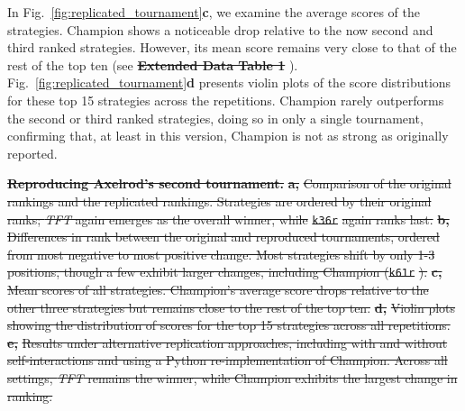 \documentclass{article}
\newcommand{\TFT}{\emph{TFT}}
\providecommand{\DIFaddtex}[1]{{\protect\color{blue}\uwave{#1}}} %
\providecommand{\DIFdeltex}[1]{{\protect\color{red}\sout{#1}}}                      %
\providecommand{\DIFaddbegin}{} %
\providecommand{\DIFaddend}{} %
\providecommand{\DIFdelbegin}{} %
\providecommand{\DIFdelend}{} %
\providecommand{\DIFdelFL}[1]{\DIFdel{#1}} %
\providecommand{\DIFadd}[1]{\texorpdfstring{\DIFaddtex{#1}}{#1}} %
\providecommand{\DIFdel}[1]{\texorpdfstring{\DIFdeltex{#1}}{}} %
\newcommand{\DIFscaledelfig}{0.5}
\newlength{\DIFdelgraphicswidth} %
\newlength{\DIFdelgraphicsheight} %
\newcommand{\DIFaddincludegraphics}[2][]{{\color{blue}\fbox{\DIFOincludegraphics[#1]{#2}}}} %
\newcommand{\DIFdelincludegraphics}[2][]{%
\sbox{\DIFdelgraphicsbox}{\DIFOincludegraphics[#1]{#2}}%
\settoboxwidth{\DIFdelgraphicswidth}{\DIFdelgraphicsbox} %
\settoboxtotalheight{\DIFdelgraphicsheight}{\DIFdelgraphicsbox} %
\scalebox{\DIFscaledelfig}{%
\parbox[b]{\DIFdelgraphicswidth}{\usebox{\DIFdelgraphicsbox}\\[-\baselineskip] \rule{\DIFdelgraphicswidth}{0em}}\llap{\resizebox{\DIFdelgraphicswidth}{\DIFdelgraphicsheight}{%
\setlength{\unitlength}{\DIFdelgraphicswidth}%
\begin{picture}(1,1)%
\thicklines\linethickness{2pt} %
{\color[rgb]{1,0,0}\put(0,0){\framebox(1,1){}}}%
{\color[rgb]{1,0,0}\put(0,0){\line( 1,1){1}}}%
{\color[rgb]{1,0,0}\put(0,1){\line(1,-1){1}}}%
\end{picture}%
}\hspace*{3pt}}} %
} %
\DeclareRobustCommand{\DIFaddbegin}{\DIFOaddbegin \let\includegraphics\DIFaddincludegraphics} %
\DeclareRobustCommand{\DIFaddend}{\DIFOaddend \let\includegraphics\DIFOincludegraphics} %
\DeclareRobustCommand{\DIFdelbegin}{\DIFOdelbegin \let\includegraphics\DIFdelincludegraphics} %
\DeclareRobustCommand{\DIFdelend}{\DIFOaddend \let\includegraphics\DIFOincludegraphics} %
\begin{document}
In Fig.~\ref{fig:replicated_tournament}\textbf{c}, we examine the average scores of the
strategies. Champion shows a noticeable drop relative to the now
second and third ranked strategies. However, its mean score remains very close to that
of the rest of the top ten (see \DIFdelbegin \textbf{\DIFdel{Extended Data Table 1}}%
\DIFdelend \DIFaddbegin \DIFadd{Supplementary Table~1}\DIFaddend ).
Fig.~\ref{fig:replicated_tournament}\textbf{d} presents violin plots of the
score distributions for these top 15 strategies across the
 repetitions. Champion
rarely outperforms the second or third ranked strategies, doing so in only a
single tournament, confirming that, at least in this version, Champion
is not as strong as originally reported.

\DIFdelbegin %
{%
\textbf{\DIFdelFL{Reproducing Axelrod's second tournament.}}
\textbf{\DIFdelFL{a,}} %
\DIFdelFL{Comparison of the original rankings and the replicated rankings.
Strategies are ordered by their original ranks; \TFT{} again
emerges as the overall winner, while }\texttt{\DIFdelFL{k36r}} %
\DIFdelFL{again ranks last.
}\textbf{\DIFdelFL{b,}} %
\DIFdelFL{Differences in rank between the original and reproduced tournaments,
ordered from most negative to most positive change. Most strategies shift by
only 1-3 positions, though a few exhibit larger changes, including Champion
(}\texttt{\DIFdelFL{k61r}}%
\DIFdelFL{).
}\textbf{\DIFdelFL{c,}} %
\DIFdelFL{Mean scores of all strategies. Champion's
average score drops relative to the other three strategies but remains close to
the rest of the top ten.
}\textbf{\DIFdelFL{d,}} %
\DIFdelFL{Violin plots showing the distribution of scores for the top 15
strategies across all repetitions.
}\textbf{\DIFdelFL{e,}} %
\DIFdelFL{Results under alternative replication approaches, including with and
without self-interactions and using a Python re-implementation of Champion.
Across all settings, \TFT{} remains the winner, while Champion exhibits the
largest change in ranking.}}
\end{document}

